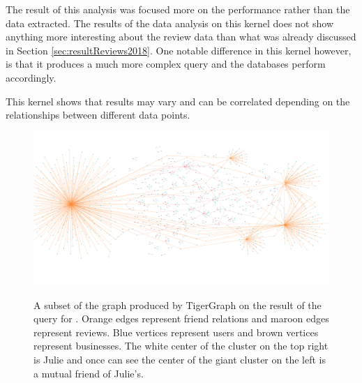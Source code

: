 
The result of this analysis was focused more on the performance rather than the data extracted. The results of the data analysis on this kernel does not show anything more interesting about the review data than what was already discussed in Section \ref{sec:resultReviews2018}. One notable difference in this kernel however, is that it produces a much more complex query and the databases perform accordingly.

This kernel shows that results may vary and can be correlated depending on the relationships between different data points.

\begin{figure}[h]
    \centering
    \begin{mdframed}[backgroundcolor=gray!70!white, style=GraphFrame]
    {\includegraphics[width=\textwidth]{img/cityGraph.png}}
    \end{mdframed}
    \caption{A subset of the graph produced by TigerGraph on the result of the query for . Orange edges represent friend relations and maroon edges represent reviews. Blue vertices represent users and brown vertices represent businesses. The white center of the cluster on the top right is Julie and once can see the center of the giant cluster on the left is a mutual friend of Julie's. }
    \label{fig:cityGraph}
\end{figure}

